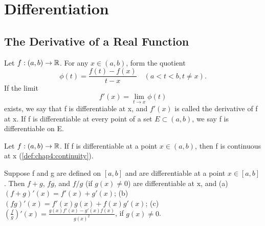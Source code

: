 
\chapter{Differentiation}
\label{chap:rudin5}

\section{The Derivative of a Real Function}
\label{sec:chap5:derivative_real}

\begin{definition}[Derivative] %
  \label{def:chap5:derivative}
  Let $f: (a, b) \to \mathbb{R}$. For any $x \in (a, b)$, form the quotient
  \[ \phi(t) = \frac{f(t) - f(x)}{t - x} \quad (a < t < b, t \ne x). \]
  If the limit
  \[ f'(x) = \lim_{t \to x} \phi(t) \]
  exists, we say that f is differentiable at x, and $f'(x)$ is called
  the derivative of f at x. If f is differentiable at every point of
  a set $E \subset (a, b)$, we say f is differentiable on E.
\end{definition}

\begin{theorem} %
  \label{thm:chap5:diff_implies_cont}
  Let $f: (a, b) \to \mathbb{R}$. If f is differentiable at a point $x \in
  (a, b)$, then f is continuous at x (\autoref{def:chap4:continuity}).
\end{theorem}

\begin{theorem} %
  \label{thm:chap5:derivative_algebra}
  Suppose f and g are defined on $[a, b]$ and are differentiable at a
  point $x \in [a, b]$. Then $f+g$, $fg$, and $f/g$ (if $g(x) \ne 0$)
  are differentiable at x, and
  (a) $(f+g)'(x) = f'(x) + g'(x)$;
  (b) $(fg)'(x) = f'(x)g(x) + f(x)g'(x)$;
  (c) $\left( \frac{f}{g} \right)'(x) = \frac{g(x)f'(x) -
  g'(x)f(x)}{g(x)^2}$, if $g(x) \ne 0$.
\end{theorem}



